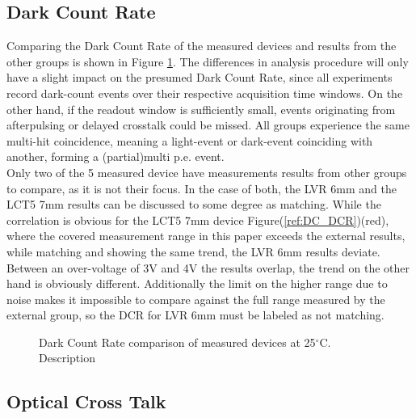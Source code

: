\documentclass[12pt,article,type=msc,colorback,accentcolor=tud9c]{tudthesis}
\begin{document}
\subsection{Dark Count Rate}
\label{subsec:DC_DCR}

Comparing the Dark Count Rate of the measured devices and results from the other groups is shown in Figure \ref{fig:DC_DCR}. The differences in analysis procedure will only have a slight impact on the presumed Dark Count Rate, since all experiments record dark-count events over their respective acquisition time windows. On the other hand, if the readout window is sufficiently small, events originating from afterpulsing or delayed crosstalk could be missed. All groups experience the same multi-hit coincidence, meaning a light-event or dark-event coinciding with another, forming a (partial)multi p.e. event.\\
Only two of the 5 measured device have measurements results from other groups to compare, as it is not their focus. In the case of both, the LVR 6mm and the LCT5 7mm results can be discussed to some degree as matching. While the correlation is obvious for the LCT5 7mm device Figure(\ref{ref:DC_DCR})(red), where the covered measurement range in this paper exceeds the  external results, while matching and showing the same trend, the LVR 6mm results deviate. Between an over-voltage of 3V and 4V the results overlap, the trend on the other hand is obviously different. Additionally the limit on the higher range due to noise makes it impossible to compare against the full range measured by the external group, so the DCR for LVR 6mm must be labeled as not matching. 

\begin{figure}%
\begin{centering}
\caption{Dark Count Rate comparison of measured devices at 25$^\circ$C. Description}
\label{fig:DC_DCR}
\end{centering}
\end{figure}

\subsection{Optical Cross Talk}
\label{subsec:DC_OCT}
\end{document}
